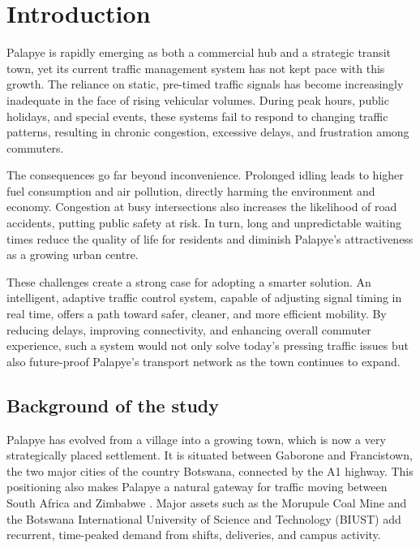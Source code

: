 \documentclass[11pt, a4paper]{report}
\begin{document}
\onehalfspacing

\chapter{Introduction}

Palapye is rapidly emerging as both a commercial hub and a strategic transit town, yet its current traffic management system has not kept pace with this growth. The reliance on static, pre-timed traffic signals has become increasingly inadequate in the face of rising vehicular volumes. During peak hours, public holidays, and special events, these systems fail to respond to changing traffic patterns, resulting in chronic congestion, excessive delays, and frustration among commuters.

The consequences go far beyond inconvenience. Prolonged idling leads to higher fuel consumption and air pollution, directly harming the environment and economy. Congestion at busy intersections also increases the likelihood of road accidents, putting public safety at risk. In turn, long and unpredictable waiting times reduce the quality of life for residents and diminish Palapye's attractiveness as a growing urban centre.

These challenges create a strong case for adopting a smarter solution. An intelligent, adaptive traffic control system, capable of adjusting signal timing in real time, offers a path toward safer, cleaner, and more efficient mobility. By reducing delays, improving connectivity, and enhancing overall commuter experience, such a system would not only solve today's pressing traffic issues but also future-proof Palapye's transport network as the town continues to expand.

\section{Background of the study}

Palapye has evolved from a village into a growing town, which is now a very strategically placed settlement. It is situated between Gaborone and Francistown, the two major cities of the country Botswana, connected by the A1 highway. This positioning also makes Palapye a natural gateway for traffic moving between South Africa and Zimbabwe \cite{BIUST_LocateUs}. Major assets such as the Morupule Coal Mine and the Botswana International University of Science and Technology (BIUST) add recurrent, time-peaked demand from shifts, deliveries, and campus activity.
\end{document}
